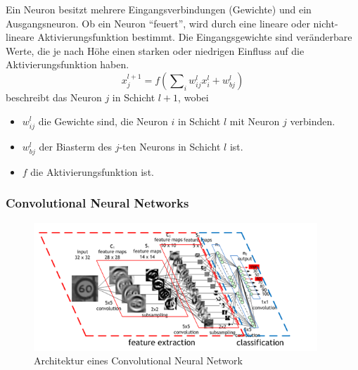 \noindent
Ein Neuron besitzt mehrere Eingangsverbindungen (Gewichte) und ein Ausgangsneuron. Ob ein Neuron "`feuert"', wird durch eine lineare oder nicht-lineare Aktivierungsfunktion bestimmt. Die Eingangsgewichte sind veränderbare Werte, die je nach Höhe einen starken oder niedrigen Einfluss auf die Aktivierungsfunktion haben.
\begin{equation}\label{equ:neuron}
x^{l+1}_{j}=f(\sum\nolimits_i w^l_{ij}x^l_i + w^l_{bj})
\end{equation}
beschreibt das Neuron $j$ in Schicht $l+1$, wobei
\begin{itemize}
	\item $w^l_{ij}$ die Gewichte sind, die Neuron $i$ in Schicht $l$ mit Neuron $j$ verbinden.
	\item $w^l_{bj}$ der Biasterm des $j$-ten Neurons in Schicht $l$ ist.
	\item $f$ die Aktivierungsfunktion ist.\cite[S. 129]{ref:verrelst}
\end{itemize} 

\subsubsection{Convolutional Neural Networks}\label{sec:sub:sub:cnn}
\begin{figure}[ht]
  \centering
  \includegraphics[width=0.95\textwidth]{pics/cnn.png}
  \caption[CNN]{Architektur eines Convolutional Neural Network\cite{ref:cnn-architecture}}
  \label{fig:cnn-architecture}
\end{figure}

